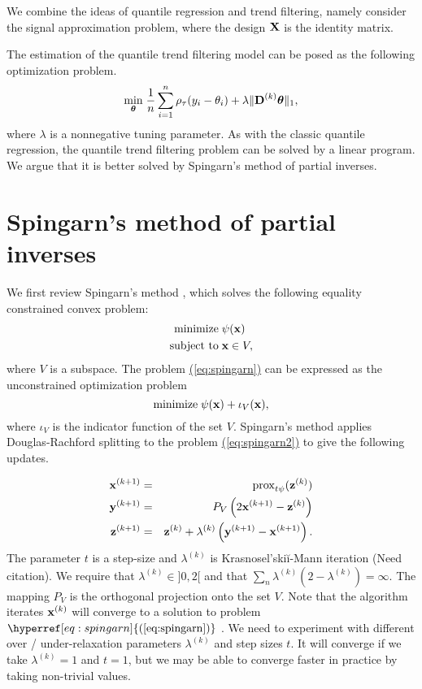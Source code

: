\documentclass{article}
\newcommand{\Eqn}[1]{\hyperref[eq:#1]{{\rm (\ref*{eq:#1})}}} %
\newcommand{\Eqn}[1]{{(\ref{eq:#1})}} %
\newcommand{\V}[1]{{\bm{\mathbf{\MakeLowercase{#1}}}}} %
\newcommand{\VE}[2]{\MakeLowercase{#1}_{#2}} %
\newcommand{\Vn}[2]{\V{#1}^{(#2)}} %
\newcommand{\M}[1]{{\bm{\mathbf{\MakeUppercase{#1}}}}} %
\newcommand{\Mn}[2]{\M{#1}^{(#2)}} %
\newcommand{\prox}[2]{\operatorname{prox}_{#1}({#2})}
\begin{document}
We combine the ideas of quantile regression and trend filtering, namely consider the signal approximation problem, where the design $\M{X}$ is the identity matrix.

The estimation of the quantile trend filtering model can be posed as the following optimization problem.
\begin{eqnarray}
\label{eq:quantile_trend}
	\underset{\V{\theta}}{\min}\; \frac{1}{n} \sum_{i=1}^n \rho_\tau(\VE{y}{i} - \VE{\theta}{i}) + \lambda \lVert \Mn{D}{k} \V{\theta} \rVert_1,
\end{eqnarray}
where $\lambda$ is a nonnegative tuning parameter. As with the classic quantile regression, the quantile trend filtering problem can be solved by a linear program. We argue that it is better solved by Spingarn's method of partial inverses.

\section{Spingarn's method of partial inverses}

We first review Spingarn's method \cite{Spingarn1985}, which solves the following equality constrained convex problem:
\begin{equation}
\label{eq:spingarn}
\begin{split}
\text{minimize}\; & \psi(\V{x}) \\
\text{subject to}\; & \V{x} \in V,
\end{split}
\end{equation}
where $V$ is a subspace. The problem \Eqn{spingarn} can be expressed as the unconstrained optimization problem
\begin{equation}
\label{eq:spingarn2}
\text{minimize}\; \psi(\V{x}) + \iota_V(\V{x}),
\end{equation}
where $\iota_V$ is the indicator function of the set $V$. Spingarn's method applies Douglas-Rachford splitting to the problem \Eqn{spingarn2} to give the following updates.

\begin{eqnarray*}
\Vn{x}{k+1} & = & \prox{t\psi}{\Vn{z}{k}} \\
\Vn{y}{k+1} & = & P_V\left(2\Vn{x}{k+1} - \Vn{z}{k} \right) \\
\Vn{z}{k+1} & = & \Vn{z}{k} + \lambda^{(k)}\left(\Vn{y}{k+1} - \Vn{x}{k+1} \right).
\end{eqnarray*}
The parameter $t$ is a step-size and $\lambda^{(k)}$ is Krasnosel'ski{\u i}-Mann iteration (Need citation). We require that $\lambda^{(k)} \in ]0, 2[$ and that $\sum_n \lambda^{(k)} (2-\lambda^{(k)}) = \infty$. The mapping $P_V$ is the orthogonal projection onto the set $V$.  Note that the algorithm iterates $\Vn{x}{k}$ will converge to a solution to problem $\Eqn{spingarn}$ \cite{Combettes2005}. We need to experiment with different over / under-relaxation parameters $\lambda^{(k)}$ and step sizes $t$. It will converge if we take $\lambda^{(k)} = 1$ and $t = 1$, but we may be able to converge faster in practice by taking non-trivial values.
\end{document}
